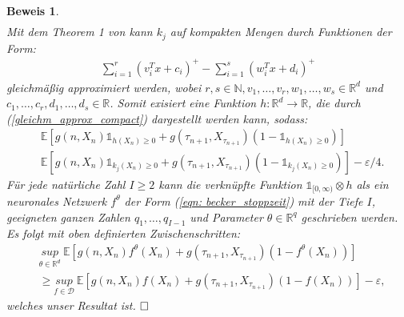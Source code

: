 \documentclass[12pt,titlepage,headsepline]{article}
\newtheorem*{beweis-non}{Beweis}
\begin{document}
\begin{beweis-non}
{\begin{align*}
        \end{align*}
        Mit dem Theorem 1 von \cite{leshno_multilayer_1993} kann $k_j$ auf kompakten Mengen durch Funktionen der Form:
        \begin{align}\label{gleichm_approx_compact}
          \sum_{i=1}^r(v_i^Tx + c_i)^+ - \sum_{i=1}^s(w_i^Tx + d_i)^+
        \end{align}
        gleichmäßig approximiert werden, wobei $r,s \in \mathbb{N}, v_1,\ldots,v_r,w_1,\ldots,w_s \in \mathbb{R}^d$ und $c_1,\ldots,c_r,d_1,\ldots,d_s \in \mathbb{R}$. Somit exisiert eine Funktion $h:\mathbb{R}^d \rightarrow \mathbb{R}$, die durch (\ref{gleichm_approx_compact}) dargestellt werden kann, sodass:
        \begin{align*}
          & \mathbb{E}[g(n,X_n)\mathds{1}_{h(X_n)\geq 0 }+g(\tau_{n+1},X_{\tau_{n+1}})(1-\mathds{1}_{h(X_n)\geq 0 })] \\
          & \mathbb{E}[g(n,X_n)\mathds{1}_{k_j(X_n)\geq 0 }+g(\tau_{n+1},X_{\tau_{n+1}})(1-\mathds{1}_{k_j(X_n)\geq 0 })] - \varepsilon/4.
        \end{align*}
        Für jede natürliche Zahl $I\geq2$ kann die verknüpfte Funktion $\mathds{1}_{[0,\infty)}\otimes h$ als ein neuronales Netzwerk $f^{\theta}$ der Form (\ref{eqn: becker_stoppzeit}) mit der Tiefe $I$, geeigneten ganzen Zahlen $q_1,\ldots,q_{I-1}$ und Parameter $\theta \in \mathbb{R}^q$ geschrieben werden. Es folgt mit oben definierten Zwischenschritten:
        \begin{align*}
          & \underset{\theta \in \mathbb{R}^d}{sup} \ \mathbb{E}[g(n,X_n)f^{\theta}(X_n)+g(\tau_{n+1},X_{\tau_{n+1}})(1-f^{\theta}(X_n))] \\
          & \geq \underset{f \in \mathcal{D}}{sup} \ \mathbb{E}[g(n,X_n)f(X_n)+g(\tau_{n+1},X_{\tau_{n+1}})(1-f(X_n))] - \varepsilon,
        \end{align*}
        welches unser Resultat ist.
        $\hfill\Box$
        }
      \end{beweis-non}

      \newpage
\end{document}
